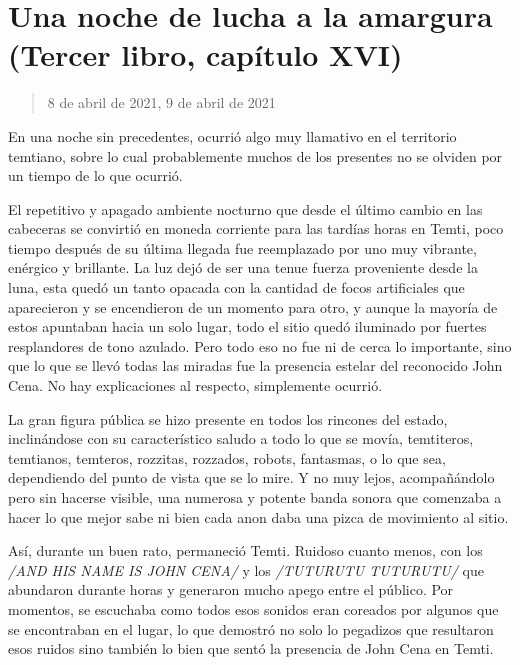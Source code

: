 \documentclass[
]{book}
\begin{document}
\hypertarget{una-noche-de-lucha-a-la-amargura-tercer-libro-capuxedtulo-xvi}{%
\section{Una noche de lucha a la amargura (Tercer libro, capítulo XVI)}\label{una-noche-de-lucha-a-la-amargura-tercer-libro-capuxedtulo-xvi}}

\begin{quote}
8 de abril de 2021, 9 de abril de 2021
\end{quote}

En una noche sin precedentes, ocurrió algo muy llamativo en el territorio temtiano, sobre lo cual probablemente muchos de los presentes no se olviden por un tiempo de lo que ocurrió.

El repetitivo y apagado ambiente nocturno que desde el último cambio en las cabeceras se convirtió en moneda corriente para las tardías horas en Temti, poco tiempo después de su última llegada fue reemplazado por uno muy vibrante, enérgico y brillante. La luz dejó de ser una tenue fuerza proveniente desde la luna, esta quedó un tanto opacada con la cantidad de focos artificiales que aparecieron y se encendieron de un momento para otro, y aunque la mayoría de estos apuntaban hacia un solo lugar, todo el sitio quedó iluminado por fuertes resplandores de tono azulado. Pero todo eso no fue ni de cerca lo importante, sino que lo que se llevó todas las miradas fue la presencia estelar del reconocido John Cena. No hay explicaciones al respecto, simplemente ocurrió.

La gran figura pública se hizo presente en todos los rincones del estado, inclinándose con su característico saludo a todo lo que se movía, temtiteros, temtianos, temteros, rozzitas, rozzados, robots, fantasmas, o lo que sea, dependiendo del punto de vista que se lo mire. Y no muy lejos, acompañándolo pero sin hacerse visible, una numerosa y potente banda sonora que comenzaba a hacer lo que mejor sabe ni bien cada anon daba una pizca de movimiento al sitio.

Así, durante un buen rato, permaneció Temti. Ruidoso cuanto menos, con los \emph{/AND HIS NAME IS JOHN CENA/} y los \emph{/TUTURUTU TUTURUTU/} que abundaron durante horas y generaron mucho apego entre el público. Por momentos, se escuchaba como todos esos sonidos eran coreados por algunos que se encontraban en el lugar, lo que demostró no solo lo pegadizos que resultaron esos ruidos sino también lo bien que sentó la presencia de John Cena en Temti.
\end{document}
